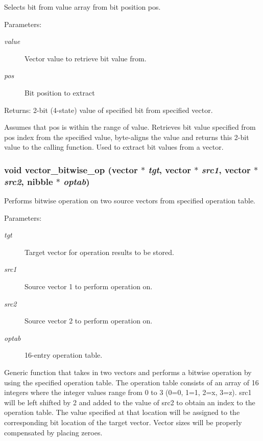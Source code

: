 Selects bit from value array from bit position pos. 

\begin{Desc}
\item[Parameters:]
\begin{description}
\item[{\em value}]Vector value to retrieve bit value from. \item[{\em pos}]Bit position to extract \end{description}
\end{Desc}
\begin{Desc}
\item[Returns:]2-bit (4-state) value of specified bit from specified vector.\end{Desc}
Assumes that pos is within the range of value. Retrieves bit value specified from pos index from the specified value, byte-aligns the value and returns this 2-bit value to the calling function. Used to extract bit values from a vector. 
\subsubsection{\setlength{\rightskip}{0pt plus 5cm}void vector\_\-bitwise\_\-op ({\bf vector} $\ast$ {\em tgt}, {\bf vector} $\ast$ {\em src1}, {\bf vector} $\ast$ {\em src2}, {\bf nibble} $\ast$ {\em optab})}\label{vector_8c_a36}


Performs bitwise operation on two source vectors from specified operation table. 

\begin{Desc}
\item[Parameters:]
\begin{description}
\item[{\em tgt}]Target vector for operation results to be stored. \item[{\em src1}]Source vector 1 to perform operation on. \item[{\em src2}]Source vector 2 to perform operation on. \item[{\em optab}]16-entry operation table.\end{description}
\end{Desc}
Generic function that takes in two vectors and performs a bitwise operation by using the specified operation table. The operation table consists of an array of 16 integers where the integer values range from 0 to 3 (0=0, 1=1, 2=x, 3=z). src1 will be left shifted by 2 and added to the value of src2 to obtain an index to the operation table. The value specified at that location will be assigned to the corresponding bit location of the target vector. Vector sizes will be properly compensated by placing zeroes. 
